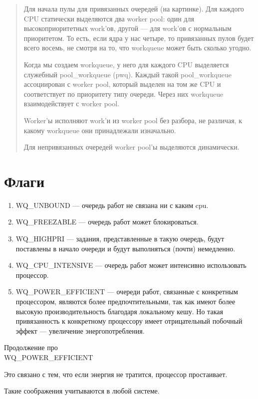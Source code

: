 \begin{quote}
  Для начала пулы для привязанных очередей (на картинке). Для каждого CPU статически выделяются два worker pool: один для высокоприоритетных work’ов, другой — для work’ов с нормальным приоритетом. То есть, если ядра у нас четыре, то привязанных пулов будет всего восемь, не смотря на то, что workqueue может быть сколько угодно.

Когда мы создаем workqueue, у него для каждого CPU выделяется служебный pool\_workqueue (pwq). Каждый такой pool\_workqueue ассоциирован с worker pool, который выделен на том же CPU и соответствует по приоритету типу очереди. Через них workqueue взаимодействует с worker pool.

Worker’ы исполняют work’и из worker pool без разбора, не различая, к какому workqueue они принадлежали изначально.

Для непривязанных очередей worker pool’ы выделяются динамически.
\end{quote}

\section{Флаги}

\begin{enumerate}
  \item WQ\_UNBOUND --- очередь работ не связана ни с каким cpu.
  \item WQ\_FREEZABLE --- очередь работ может блокироваться.
  \item WQ\_HIGHPRI --- задания, представленные в такую очередь, будут поставлены в начало очереди и будут выполняться (почти) немедленно.
  \item WQ\_CPU\_INTENSIVE --- очередь работ может интенсивно использовать процессор.
  \item WQ\_POWER\_EFFICIENT --- очереди работ, связанные с конкретным процессором, являются более предпочтительными, так как имеют более высокую производительность благодаря локальному кешу. Но такая привязанность к конкретному процессору имеет отрицательный побочный эффект --- увеличение энергопотребления.
\end{enumerate}

Продолжение про \\ WQ\_POWER\_EFFICIENT

Это связано с тем, что если энергия не тратится, процессор простаивает.

Такие соображения учитываются в любой системе.

